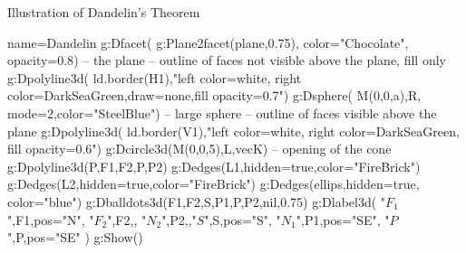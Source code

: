 \begin{demo}{Illustration of Dandelin's Theorem}
\begin{luadraw}{name=Dandelin}
g:Dfacet( g:Plane2facet(plane,0.75), {color="Chocolate", opacity=0.8}) -- the plane
 -- outline of faces not visible above the plane, fill only
g:Dpolyline3d( ld.border(H1),"left color=white, right color=DarkSeaGreen,draw=none,fill opacity=0.7")
g:Dsphere( M(0,0,a),R, {mode=2,color="SteelBlue"}) -- large sphere
 -- outline of faces visible above the plane
g:Dpolyline3d( ld.border(V1),"left color=white, right color=DarkSeaGreen, fill opacity=0.6")
g:Dcircle3d(M(0,0,5),L,vecK) -- opening of the cone
g:Dpolyline3d({{P,F1},{F2,P,P2}})
g:Dedges(L1,{hidden=true,color="FireBrick"})
g:Dedges(L2,{hidden=true,color="FireBrick"})
g:Dedges(ellips,{hidden=true, color="blue"})
g:Dballdots3d({F1,F2,S,P1,P,P2},nil,0.75)
g:Dlabel3d( "$F_1$",F1,{pos="N"}, "$F_2$",F2,{}, "$N_2$",P2,{},"$S$",S,{pos="S"}, 
 "$N_1$",P1,{pos="SE"}, "$P$",P,{pos="SE"} )
g:Show()
\end{luadraw}
\end{demo}

